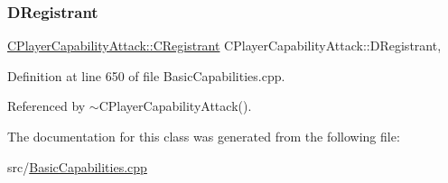\subsubsection{\texorpdfstring{D\+Registrant}{DRegistrant}}
{\footnotesize\ttfamily \hyperlink{classCPlayerCapabilityAttack_1_1CRegistrant}{C\+Player\+Capability\+Attack\+::\+C\+Registrant} C\+Player\+Capability\+Attack\+::\+D\+Registrant\hspace{0.3cm}{\ttfamily [static]}, {\ttfamily [protected]}}



Definition at line 650 of file Basic\+Capabilities.\+cpp.



Referenced by $\sim$\+C\+Player\+Capability\+Attack().



The documentation for this class was generated from the following file\+:\begin{DoxyCompactItemize}
\item 
src/\hyperlink{BasicCapabilities_8cpp}{Basic\+Capabilities.\+cpp}\end{DoxyCompactItemize}
